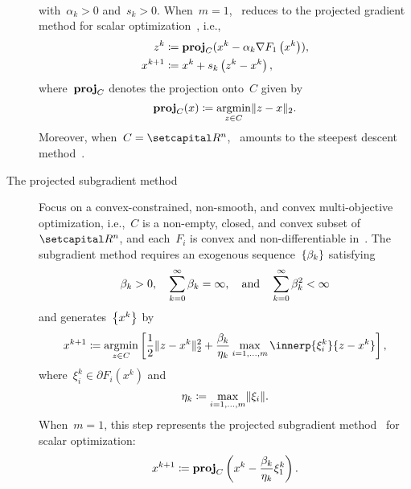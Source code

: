 \documentclass[../../main]{subfiles}
\begin{document}
\begin{example}
\begin{description}
\begin{equation}
\begin{aligned}
                \end{aligned}
            \end{equation} 
            with~$\alpha_k > 0$ and~$s_k > 0$.
            When~$m = 1$,~ reduces to the projected gradient method for scalar optimization~\cite{Polyak1963,Goldstein1964,Goldstein1967,McCormick1969}, i.e.,
            \begin{equation}
                \begin{aligned}
                    z^k &\coloneqq \proj_C (x^k - \alpha_k \nabla F_1\left(x^k\right)), \\
                    x^{k + 1} &\coloneqq x^k + s_k \left( z^k - x^k \right)
                ,\end{aligned}
            \end{equation} 
            where~$\proj_C$ denotes the projection onto~$C$ given by
            \begin{equation} \label{eq:proj}
                \proj_C(x) \coloneqq \argmin_{z \in C} \norm{z - x}_2
            .\end{equation} 
            Moreover, when~$C = \setR^n$,~ amounts to the steepest descent method~.
        \item[The projected subgradient method~\cite{Bello-Cruz2013}]
            Focus on a convex-constrained, non-smooth, and convex multi-objective optimization, i.e.,~$C$ is a non-empty, closed, and convex subset of~$\setR^n$, and each~$F_i$ is convex and non-differentiable in~.
            The subgradient method requires an exogenous sequence~$\set{\beta_k}$ satisfying
            \begin{equation}
                \beta_k > 0, \quad \sum_{k = 0}^{\infty} \beta_k = \infty, \eqand \sum_{k = 0}^{\infty} \beta_k^2 < \infty 
            \end{equation} 
            and generates~$\set*{x^k}$ by
            \begin{equation}
                    x^{k + 1} \coloneqq \argmin_{z \in C} \left[ \frac{1}{2} \norm{z - x^k}_2^2 + \frac{\beta_k}{\eta_k} \max_{i = 1, \dots, m} \innerp{\xi^k_i}{z - x^k} \right] 
            ,\end{equation} 
            where~$\xi^k_i \in \partial F_i\left(x^k\right)$ and
            \begin{equation}
                \eta_k \coloneqq \max_{i = 1, \dots, m} \norm{\xi_i}
            .\end{equation} 
            When~$m = 1$, this step represents the projected subgradient method~\cite{Polyak1967,Polyak1969,Shor1985,Alber1998,Alber2001} for scalar optimization:
            \begin{equation}
                x^{k + 1} \coloneqq \proj_C\left( x^k - \frac{\beta_k}{\eta_k} \xi^k_1 \right) 
            .\end{equation} 
    \end{description}
\end{example}
\end{document}
